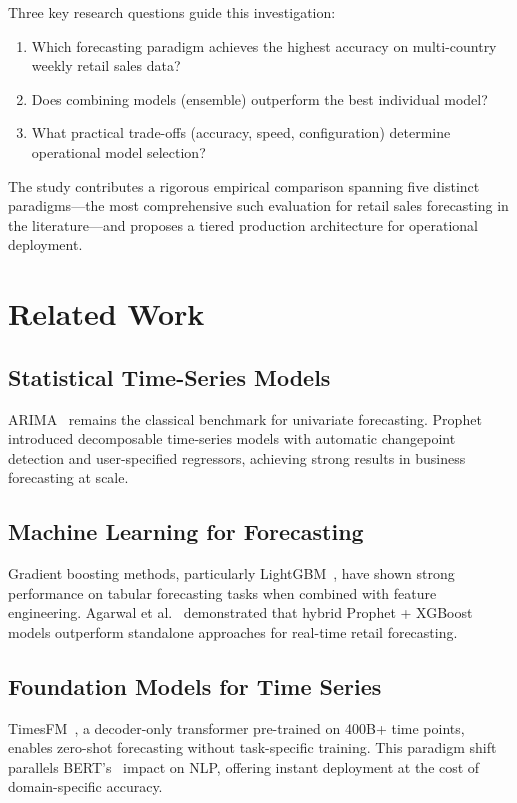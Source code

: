 \documentclass[10pt,twocolumn,a4paper]{article}
\begin{document}
Three key research questions guide this investigation:
\begin{enumerate}[leftmargin=*,noitemsep,topsep=2pt]
    \item[\textbf{RQ1:}] Which forecasting paradigm achieves the highest accuracy on multi-country weekly retail sales data?
    \item[\textbf{RQ2:}] Does combining models (ensemble) outperform the best individual model?
    \item[\textbf{RQ3:}] What practical trade-offs (accuracy, speed, configuration) determine operational model selection?
\end{enumerate}

The study contributes a rigorous empirical comparison spanning five distinct paradigms---the most comprehensive such evaluation for retail sales forecasting in the literature---and proposes a tiered production architecture for operational deployment.

\section{Related Work}
\label{sec:related}

\subsection{Statistical Time-Series Models}
ARIMA~\cite{box1970time} remains the classical benchmark for univariate forecasting. Prophet~\cite{taylor2018forecasting} introduced decomposable time-series models with automatic changepoint detection and user-specified regressors, achieving strong results in business forecasting at scale.

\subsection{Machine Learning for Forecasting}
Gradient boosting methods, particularly LightGBM~\cite{ke2017lightgbm}, have shown strong performance on tabular forecasting tasks when combined with feature engineering. Agarwal et al.~\cite{agarwal2026realtime} demonstrated that hybrid Prophet + XGBoost models outperform standalone approaches for real-time retail forecasting.

\subsection{Foundation Models for Time Series}
TimesFM~\cite{das2024timesfm}, a decoder-only transformer pre-trained on 400B+ time points, enables zero-shot forecasting without task-specific training. This paradigm shift parallels BERT's~\cite{devlin2019bert} impact on NLP, offering instant deployment at the cost of domain-specific accuracy.
\end{document}

